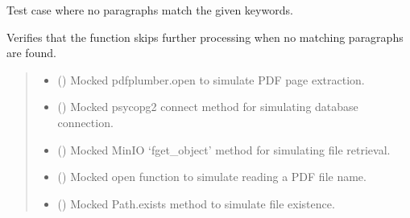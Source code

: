 \documentclass[letterpaper,10pt,english]{sphinxmanual}
\begin{document}
\begin{fulllineitems}
\label{\detokenize{test.data_storage:test.data_storage.test_retry_failed_reports.test_no_matching_paragraphs}}
\pysigstartsignatures
\pysiglinewithargsret
{}
{\sphinxparamcomma {}\sphinxparamcomma {}\sphinxparamcomma {}\sphinxparamcomma {}}
{}
\pysigstopsignatures
\sphinxAtStartPar
Test case where no paragraphs match the given keywords.

\sphinxAtStartPar
Verifies that the function skips further processing when no matching paragraphs are found.
\begin{quote}\begin{description}
\begin{itemize}
\item {} 
\sphinxAtStartPar
{} () \textendash{} Mocked pdfplumber.open to simulate PDF page extraction.

\item {} 
\sphinxAtStartPar
{} () \textendash{} Mocked psycopg2 connect method for simulating database connection.

\item {} 
\sphinxAtStartPar
{} () \textendash{} Mocked MinIO ‘fget\_object’ method for simulating file retrieval.

\item {} 
\sphinxAtStartPar
{} () \textendash{} Mocked open function to simulate reading a PDF file name.

\item {} 
\sphinxAtStartPar
{} () \textendash{} Mocked Path.exists method to simulate file existence.

\end{itemize}

\end{description}\end{quote}

\end{fulllineitems}
\end{document}

